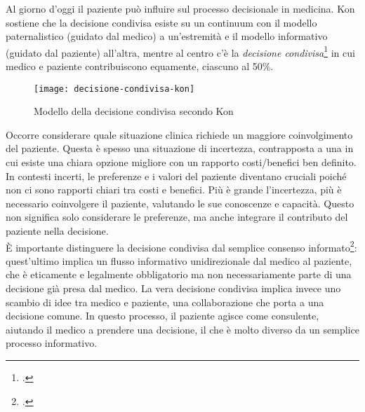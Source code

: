 Al giorno d'oggi il paziente può influire sul processo decisionale in medicina. Kon sostiene che la decisione condivisa esiste su un continuum con il modello paternalistico (guidato dal medico) a un'estremità e il modello informativo (guidato dal paziente) all'altra, mentre al centro c'è la \textit{decisione condivisa}\footcite{womak:decisione-condivisa-kon} in cui medico e paziente contribuiscono equamente, ciascuno al 50\%.\\


\begin{figure}[!ht] 
    \centering 
    \texttt{[image: decisione-condivisa-kon]} 
    \caption{Modello della decisione condivisa secondo Kon}
\end{figure}

Occorre considerare quale situazione clinica richiede un maggiore coinvolgimento del paziente. Questa è spesso una situazione di incertezza, contrapposta a una in cui esiste una chiara opzione migliore con un rapporto costi/benefici ben definito. In contesti incerti, le preferenze e i valori del paziente diventano cruciali poiché non ci sono rapporti chiari tra costi e benefici. Più è grande l'incertezza, più è necessario coinvolgere il paziente, valutando le sue conoscenze e capacità. Questo non significa solo considerare le preferenze, ma anche integrare il contributo del paziente nella decisione.\\

È importante distinguere la decisione condivisa dal semplice consenso informato\footcite{womak:recenti-progressi-medicina}: quest'ultimo implica un flusso informativo unidirezionale dal medico al paziente, che è eticamente e legalmente obbligatorio ma non necessariamente parte di una decisione già presa dal medico. La vera decisione condivisa implica invece uno scambio di idee tra medico e paziente, una collaborazione che porta a una decisione comune. In questo processo, il paziente agisce come consulente, aiutando il medico a prendere una decisione, il che è molto diverso da un semplice processo informativo.

